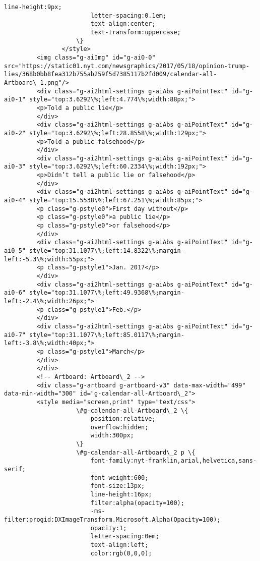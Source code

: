 \documentclass[11pt]{article}
\begin{document}
\begin{Verbatim}[commandchars=\\\{\}]
         				line-height:9px;
         				letter-spacing:0.1em;
         				text-align:center;
         				text-transform:uppercase;
         			\}
         		</style>
         <img class="g-aiImg" id="g-ai0-0" src="https://static01.nyt.com/newsgraphics/2017/05/18/opinion-trump-lies/368b0bb8fea312b755ab259f5d7385117b2fd009/calendar-all-Artboard\_1.png"/>
         <div class="g-ai2html-settings g-aiAbs g-aiPointText" id="g-ai0-1" style="top:3.6292\%;left:4.774\%;width:88px;">
         <p>Told a public lie</p>
         </div>
         <div class="g-ai2html-settings g-aiAbs g-aiPointText" id="g-ai0-2" style="top:3.6292\%;left:28.8558\%;width:129px;">
         <p>Told a public falsehood</p>
         </div>
         <div class="g-ai2html-settings g-aiAbs g-aiPointText" id="g-ai0-3" style="top:3.6292\%;left:60.2334\%;width:192px;">
         <p>Didn’t tell a public lie or falsehood</p>
         </div>
         <div class="g-ai2html-settings g-aiAbs g-aiPointText" id="g-ai0-4" style="top:15.5538\%;left:67.251\%;width:85px;">
         <p class="g-pstyle0">First day without</p>
         <p class="g-pstyle0">a public lie</p>
         <p class="g-pstyle0">or falsehood</p>
         </div>
         <div class="g-ai2html-settings g-aiAbs g-aiPointText" id="g-ai0-5" style="top:31.1077\%;left:14.8322\%;margin-left:-5.3\%;width:55px;">
         <p class="g-pstyle1">Jan. 2017</p>
         </div>
         <div class="g-ai2html-settings g-aiAbs g-aiPointText" id="g-ai0-6" style="top:31.1077\%;left:49.9368\%;margin-left:-2.4\%;width:26px;">
         <p class="g-pstyle1">Feb.</p>
         </div>
         <div class="g-ai2html-settings g-aiAbs g-aiPointText" id="g-ai0-7" style="top:31.1077\%;left:85.0117\%;margin-left:-3.8\%;width:40px;">
         <p class="g-pstyle1">March</p>
         </div>
         </div>
         <!-- Artboard: Artboard\_2 -->
         <div class="g-artboard g-artboard-v3" data-max-width="499" data-min-width="300" id="g-calendar-all-Artboard\_2">
         <style media="screen,print" type="text/css">
         			\#g-calendar-all-Artboard\_2 \{
         				position:relative;
         				overflow:hidden;
         				width:300px;
         			\}
         			\#g-calendar-all-Artboard\_2 p \{
         				font-family:nyt-franklin,arial,helvetica,sans-serif;
         				font-weight:600;
         				font-size:13px;
         				line-height:16px;
         				filter:alpha(opacity=100);
         				-ms-filter:progid:DXImageTransform.Microsoft.Alpha(Opacity=100);
         				opacity:1;
         				letter-spacing:0em;
         				text-align:left;
         				color:rgb(0,0,0);

\end{Verbatim}
\end{document}
